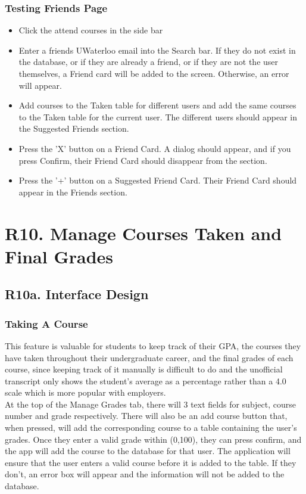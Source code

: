 \documentclass[12pt, a4paper]{article}
\begin{document}
\subsubsection*{Testing Friends Page}
\begin{itemize}
    \item Click the attend courses in the side bar
    \item Enter a friends UWaterloo email into the Search bar. If they do not exist in the database, or if they are already a friend, or if they are not the user themselves, a Friend card will be added to the screen. Otherwise, an error will appear.
    \item Add courses to the Taken table for different users and add the same courses to the Taken table for the current user. The different users should appear in the Suggested Friends section.
    \item Press the 'X' button on a Friend Card. A dialog should appear, and if you press Confirm, their Friend Card should disappear from the section.
    \item Press the '+' button on a Suggested Friend Card. Their Friend Card should appear in the Friends section.
\end{itemize}
\section*{R10. Manage Courses Taken and Final Grades}
\label{sec:R10}
\subsection*{R10a. Interface Design}
\subsubsection*{Taking A Course}
This feature is valuable for students to keep track of their GPA, the courses they have taken throughout their undergraduate career, and the final grades of each course, since keeping track of it manually is difficult to do and the unofficial transcript only shows the student's average as a percentage rather than a 4.0 scale which is more popular with employers.\\

At the top of the Manage Grades tab, there will 3 text fields for subject, course number and grade respectively. There will also be an add course button that, when pressed, will add the corresponding course to a table containing the user's grades. Once they enter a valid grade within (0,100), they can press confirm, and the app will add the course to the database for that user. The application will ensure that the user enters a valid course before it is added to the table. If they don't, an error box will appear and the information will not be added to the database.
\end{document}
